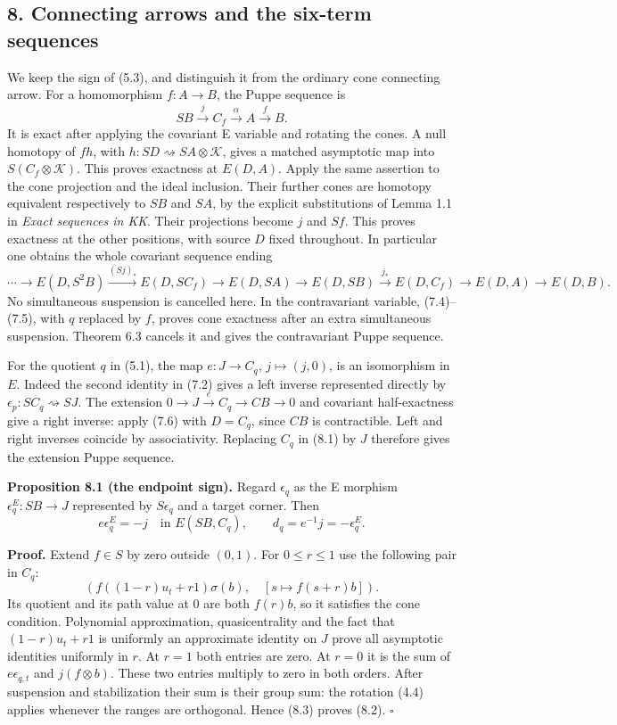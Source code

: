 \documentclass[
  11pt,
]{article}
\begin{document}
\subsection{8. Connecting arrows and the six-term
sequences}\label{connecting-arrows-and-the-six-term-sequences}

We keep the sign of (5.3), and distinguish it from the ordinary cone
connecting arrow. For a homomorphism \(f:A\to B\), the Puppe sequence is
\[
SB\xrightarrow{j}C_f\xrightarrow{\alpha}A\xrightarrow{f}B.
\tag{8.1}
\] It is exact after applying the covariant E variable and rotating the
cones. A null homotopy of \(fh\), with
\(h:SD \rightsquigarrow SA\otimes\mathcal K\), gives a matched
asymptotic map into \(S(C_f\otimes\mathcal K)\). This proves exactness
at \(E(D,A)\). Apply the same assertion to the cone projection and the
ideal inclusion. Their further cones are homotopy equivalent
respectively to \(SB\) and \(SA\), by the explicit substitutions of
Lemma 1.1 in \emph{Exact sequences in KK}. Their projections become
\(j\) and \(Sf\). This proves exactness at the other positions, with
source \(D\) fixed throughout. In particular one obtains the whole
covariant sequence ending \[
\cdots\to E(D,S^2B)\xrightarrow{(Sj)_*}E(D,SC_f)
\to E(D,SA)\to E(D,SB)\xrightarrow{j_*}
E(D,C_f)\to E(D,A)\to E(D,B).
\tag{8.1a}
\] No simultaneous suspension is cancelled here. In the contravariant
variable, (7.4)--(7.5), with \(q\) replaced by \(f\), proves cone
exactness after an extra simultaneous suspension. Theorem 6.3 cancels it
and gives the contravariant Puppe sequence.

For the quotient \(q\) in (5.1), the map \(e:J\to C_q\),
\(j\mapsto(j,0)\), is an isomorphism in \(E\). Indeed the second
identity in (7.2) gives a left inverse represented directly by
\(\epsilon_p:SC_q\rightsquigarrow SJ\). The extension
\(0\to J\xrightarrow e C_q\to CB\to0\) and covariant half-exactness give
a right inverse: apply (7.6) with \(D=C_q\), since \(CB\) is
contractible. Left and right inverses coincide by associativity.
Replacing \(C_q\) in (8.1) by \(J\) therefore gives the extension Puppe
sequence.

\textbf{Proposition 8.1 (the endpoint sign).} Regard \(\epsilon_q\) as
the E morphism \(\epsilon_q^E:SB\to J\) represented by \(S\epsilon_q\)
and a target corner. Then \[
e\epsilon_q^E=-j\quad\text{in }E(SB,C_q),
\qquad d_q=e^{-1}j=-\epsilon_q^E.
\tag{8.2}
\]

\textbf{Proof.} Extend \(f\in S\) by zero outside \((0,1)\). For
\(0\leq r\leq1\) use the following pair in \(C_q\): \[
\left(
f((1-r)u_t+r1)\sigma(b),\quad
[s\mapsto f(s+r)b]
\right).
\tag{8.3}
\] Its quotient and its path value at 0 are both \(f(r)b\), so it
satisfies the cone condition. Polynomial approximation, quasicentrality
and the fact that \((1-r)u_t+r1\) is uniformly an approximate identity
on \(J\) prove all asymptotic identities uniformly in \(r\). At \(r=1\)
both entries are zero. At \(r=0\) it is the sum of \(e\epsilon_{q,t}\)
and \(j(f\otimes b)\). These two entries multiply to zero in both
orders. After suspension and stabilization their sum is their group sum:
the rotation (4.4) applies whenever the ranges are orthogonal. Hence
(8.3) proves (8.2). \(\square\)
\end{document}
